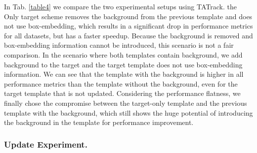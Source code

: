 \documentclass[letterpaper]{article} \usepackage{aaai23}  \usepackage{times}  \usepackage{helvet}  \usepackage{courier}  \usepackage[hyphens]{url}  \usepackage{graphicx} \urlstyle{rm} \def\UrlFont{\rm}  \usepackage{natbib}  \usepackage{caption} \frenchspacing  \setlength{\pdfpagewidth}{8.5in}  \setlength{\pdfpageheight}{11in}  \usepackage{algorithm}
\begin{document}
\begin{table}[t]
\centering
{}
\caption{Comparison with the dual-template scheme with only the target and the dual-template scheme with both including the background.}
\label{table4}
\end{table}
In Tab. \ref{table4} we compare the two experimental setups using TATrack. the Only target scheme removes the background from the previous template and does not use box-embedding, which results in a significant drop in performance metrics for all datasets, but has a faster speedup. Because the background is removed and box-embedding information cannot be introduced, this scenario is not a fair comparison. In the scenario where both templates contain background, we add background to the target and the target template does not use box-embedding information. We can see that the template with the background is higher in all performance metrics than the template without the background, even for the target template that is not updated. Considering the performance flatness, we finally chose the compromise between the target-only template and the previous template with the background, which still shows the huge potential of introducing the background in the template for performance improvement.

\subsubsection{Update Experiment.}
\end{document}
